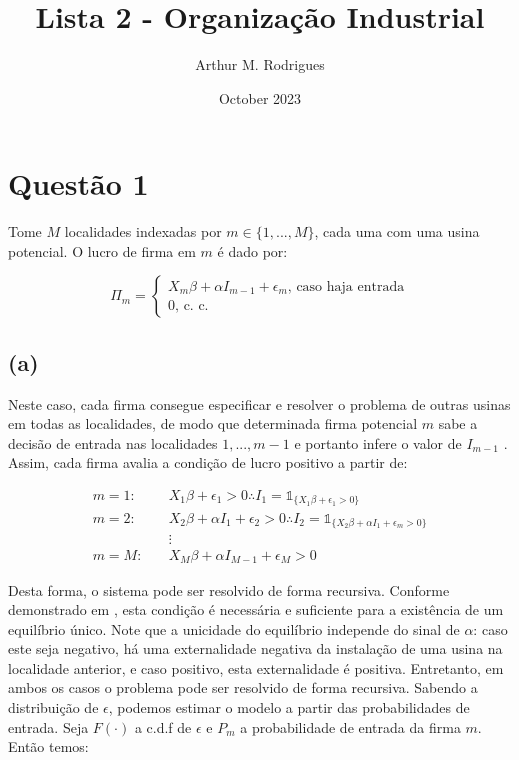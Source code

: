 \documentclass{article}
\title{Lista 2 - Organização Industrial}
\author{Arthur M. Rodrigues}
\date{October 2023}
\begin{document}
\maketitle

\section*{Questão 1}
Tome $M$ localidades indexadas por $m \in \{ 1, ..., M\}$, cada uma com uma usina potencial. O lucro de firma em $m$ é dado por:

\begin{equation*}
\Pi_m=
    \begin{cases}
        X_m\beta+\alpha I_{m-1}+\epsilon_m \text{, caso haja entrada}\\
        0 \text{, c. c.}
    \end{cases}
\end{equation*}

\subsection*{(a)}

Neste caso, cada firma consegue especificar e resolver o problema de outras usinas em todas as localidades, de modo que determinada firma potencial $m$ sabe a decisão de entrada nas localidades $1, ..., m - 1$ e portanto infere o valor de $I_{m-1}$ . Assim, cada firma avalia a condição de lucro positivo a partir de:

\begin{equation*}
\begin{aligned}
    m = 1 : \quad & X_1\beta+\epsilon_1 > 0 \therefore I_1 = \mathds{1}_{\{X_1\beta+\epsilon_1 > 0\}} \\
    m = 2 : \quad & X_2\beta+ \alpha I_1 + \epsilon_2 > 0 \therefore I_2 = \mathds{1}_{\{X_2\beta+ \alpha I_1 + \epsilon_m > 0\}} \\
    & \vdots \\
    m = M : \quad & X_M\beta+ \alpha I_{M-1} + \epsilon_M > 0
\end{aligned}
\end{equation*}

Desta forma, o sistema pode ser resolvido de forma recursiva. Conforme demonstrado em  , esta condição é necessária e suficiente para a existência de um equilíbrio único. Note que a unicidade do equilíbrio independe do sinal de $\alpha$: caso este seja negativo, há uma externalidade negativa da instalação de uma usina na localidade anterior, e caso positivo, esta externalidade é positiva. Entretanto, em ambos os casos o problema pode ser resolvido de forma recursiva. Sabendo a distribuição de $\epsilon$, podemos estimar o modelo a partir das probabilidades de entrada. Seja $F(\cdot)$ a c.d.f de $\epsilon$ e $P_m$ a probabilidade de entrada da firma $m$. Então temos:
\end{document}
